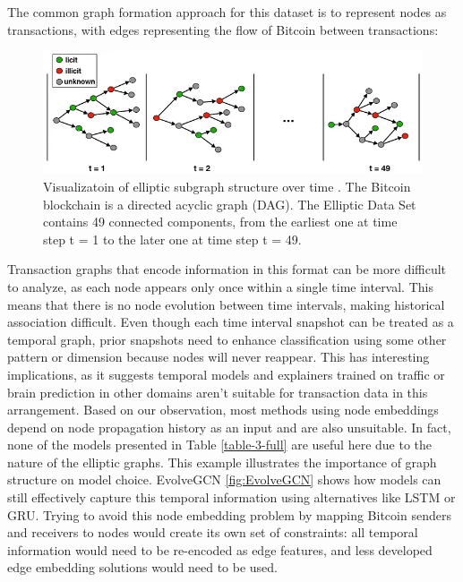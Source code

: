 The common graph formation approach for this dataset is to represent nodes as transactions, with edges representing the flow of Bitcoin between transactions:

\clearpage
\begin{figure}
    \centering 
    \includegraphics[width=\textwidth]{images/elliptic-sub-snap.png}
    \caption{Visualizatoin of elliptic subgraph structure over time \cite{bellei_elliptic_2019}. The Bitcoin blockchain is a directed acyclic graph (DAG). The Elliptic Data Set contains 49 connected components, from the earliest one at time step t = 1 to the later one at time step t = 49.}
    \label{fig:elliptic-sub-graphs}
\end{figure}

Transaction graphs that encode information in this format can be more difficult to analyze, as each node appears only once within a single time interval. This means that there is no node evolution between time intervals, making historical association difficult. Even though each time interval snapshot can be treated as a temporal graph, prior snapshots need to enhance classification using some other pattern or dimension because nodes will never reappear. This has interesting implications, as it suggests temporal models and explainers trained on traffic or brain prediction in other domains aren't suitable for transaction data in this arrangement. Based on our observation, most methods using node embeddings depend on node propagation history as an input and are also unsuitable. In fact, none of the models presented in Table \ref{table-3-full} are useful here due to the nature of the elliptic graphs. This example illustrates the importance of graph structure on model choice. EvolveGCN \ref{fig:EvolveGCN} shows how models can still effectively capture this temporal information using alternatives like LSTM or GRU. Trying to avoid this node embedding problem by mapping Bitcoin senders and receivers to nodes would create its own set of constraints: all temporal information would need to be re-encoded as edge features, and less developed edge embedding solutions would need to be used.

